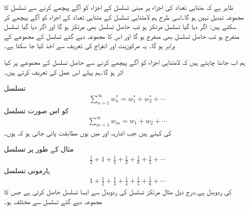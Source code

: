 ظاہر ہے کہ متناہی تعداد کی اجزاء پر مبنی تسلسل کے اجزاء کو آگے پیچھے کرنے سے تسلسل کا مجموعہ تبدیل نہیں ہو گا۔اسی طرح ہم لامتناہی تسلسل کے متناہی تعداد کے اجزاء کو آگے پیچھے کر سکتے ہیں: اگر دیا گیا تسلسل مرتکز ہو تب حاصل تسلسل بھی مرتکز ہو گا اور اگر دیا گیا تسلسل منفرج ہو تب حاصل تسلسل بھی منفرج ہو گا اور اس کا مجموعہ دیے گئے تسلسل کے مجموعے کے برابر ہو گا۔ یہ مرکوزیت اور انفراج کی تعریف سے اخذ کیا جا سکتا ہے۔

ہم اب جاننا چاہتے ہیں کہ لامتناہی اجزاء کو آگے پیچھے کرنے سے حاصل تسلسل کے مجموعے پر کیا اثر ہو گا۔ہم پہلے  اس عمل کی تعریف کرتے ہیں۔

تسلسل
\begin{align*}
\sum\limits_{n=1}^{\infty} w^*_n=w^*_1+w^*_2+\cdots
\end{align*}
کو اس صورت تسلسل
\begin{align*}
\sum\limits_{m=1}^{\infty}w_m=w_1+w_2+\cdots
\end{align*}
کی   کہتے ہیں جب اشاریہ  اور  میں یوں مطابقت پائی جاتی ہو کہ  ہوں۔ 

مثال کے طور پر تسلسل
\begin{align*}
\frac{1}{2}+1+\frac{1}{4}+\frac{1}{3}+\frac{1}{6}+\frac{1}{5}+\cdots
\end{align*}
ہارمونی تسلسل
\begin{align*}
1+\frac{1}{2}+\frac{1}{3}+\frac{1}{4}+\frac{1}{5}+\frac{1}{6}+\cdots
\end{align*}
کی ردوبدل ہے۔درج ذیل مثال مرتکز تسلسل کی ردوبدل سے ایسا تسلسل حاصل کرتی ہے جس کا مجموعہ دیے گئے تسلسل سے مختلف ہو۔

